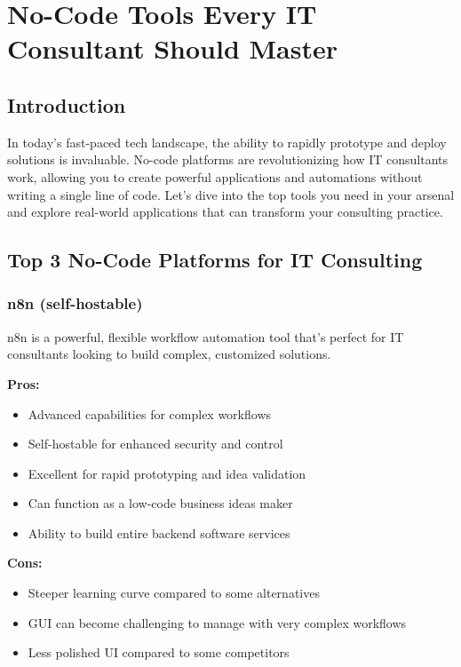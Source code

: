 \chapter{No-Code Tools Every IT Consultant Should Master}

\section{Introduction}

In today's fast-paced tech landscape, the ability to rapidly prototype and deploy solutions is invaluable. No-code platforms are revolutionizing how IT consultants work, allowing you to create powerful applications and automations without writing a single line of code. Let's dive into the top tools you need in your arsenal and explore real-world applications that can transform your consulting practice.

\section{Top 3 No-Code Platforms for IT Consulting}

\subsection{n8n (self-hostable)}

n8n is a powerful, flexible workflow automation tool that's perfect for IT consultants looking to build complex, customized solutions.

\textbf{Pros:}
\begin{itemize}
    \item Advanced capabilities for complex workflows
    \item Self-hostable for enhanced security and control
    \item Excellent for rapid prototyping and idea validation
    \item Can function as a low-code business ideas maker
    \item Ability to build entire backend software services
\end{itemize}

\textbf{Cons:}
\begin{itemize}
    \item Steeper learning curve compared to some alternatives
    \item GUI can become challenging to manage with very complex workflows
    \item Less polished UI compared to some competitors
\end{itemize}

